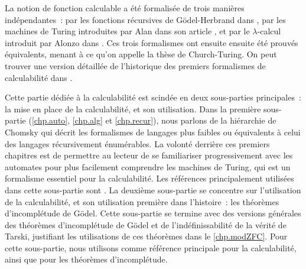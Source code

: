 La notion de fonction calculable a été formalisée de trois manières
indépendantes~: par les fonctions récursives de Gödel-Herbrand
dans \cite{Goedel1934}, par les machines de Turing introduites
par Alan  dans son article \cite{Turing1936a}, et par le
$\lambda$-calcul introduit par Alonzo  dans \cite{Church1936}.
Ces trois formalismes ont ensuite ensuite été prouvés équivalents, menant à ce
qu'on appelle la thèse de Church-Turing. On peut trouver une version détaillée de
l'historique des premiers formalismes de calculabilité dans \cite{Kleene1981}.

Cette partie dédiée à la calculabilité est scindée en deux sous-parties
principales~: la mise en place de la calculabilité, et son utilisation. Dans
la première sous-partie (\cref{chp.auto}, \cref{chp.alg} et \cref{chp.recur}),
nous parlons de la hiérarchie de Chomsky qui décrit les formalismes de
langages plus faibles ou équivalents à celui des langages récursivement
énumérables. La volonté derrière ces premiers chapitres est de permettre au
lecteur de se familiariser progressivement avec les automates pour plus
facilement comprendre les machines de Turing, qui est un formalisme
essentiel pour la calculabilité. Les références principalement utilisées dans
cette sous-partie sont \cite{Carton2014,Wolper2006}.
La deuxième sous-partie se concentre sur l'utilisation de la calculabilité, et
son utilisation première dans l'histoire~: les théorèmes d'incomplétude de
Gödel. Cette sous-partie se termine avec des versions générales des
théorèmes d'incomplétude de Gödel et de l'indéfinissabilité de la vérité
de Tarski, justifiant  les utilisations de ces
théorèmes dans le \cref{chp.modZFC}. Pour cette sous-partie, nous utilisons
comme référence principale \cite{MoninPatey2022,Soare2016} pour la
calculabilité, ainsi que \cite{NagelEtAl1997,MiquelGoedel} pour les théorèmes
d'incomplétude.

